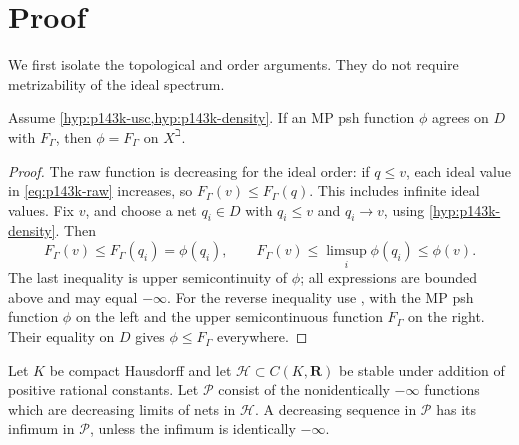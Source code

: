 \section{Proof}

We first isolate the topological and order arguments. They do not require
metrizability of the ideal spectrum.

\begin{lemma}\label{lem:p143k-comparison}
Assume \cref{hyp:p143k-usc,hyp:p143k-density}. If an MP psh function
\(\phi\) agrees on \(D\) with \(F_\Gamma\), then
\(\phi=F_\Gamma\) on \(X^\beth\).
\end{lemma}

\begin{proof}
The raw function is decreasing for the ideal order: if \(q\leq v\),
each ideal value in \eqref{eq:p143k-raw} increases, so
\(F_\Gamma(v)\leq F_\Gamma(q)\). This includes infinite ideal values.
Fix \(v\), and choose a net \(q_i\in D\) with \(q_i\leq v\) and
\(q_i\to v\), using \cref{hyp:p143k-density}. Then
\[
 F_\Gamma(v)\leq F_\Gamma(q_i)=\phi(q_i),
 \qquad
 F_\Gamma(v)\leq\limsup_i\phi(q_i)\leq\phi(v).
\]
The last inequality is upper semicontinuity of \(\phi\); all expressions
are bounded above and may equal \(-\infty\).
For the reverse inequality use
\cite[Theorem~4.3.8]{MP24}, with the MP psh function \(\phi\) on the
left and the upper semicontinuous function \(F_\Gamma\) on the right.
Their equality on \(D\) gives \(\phi\leq F_\Gamma\) everywhere.
\end{proof}

\begin{lemma}\label{lem:p143k-decreasing-completion}
Let \(K\) be compact Hausdorff and let \(\mathcal H\subset C(K,\mathbf R)\)
be stable under addition of positive rational constants. Let
\(\mathcal P\) consist of the nonidentically \(-\infty\) functions which
are decreasing limits of nets in \(\mathcal H\). A decreasing sequence
in \(\mathcal P\) has its infimum in \(\mathcal P\), unless the infimum
is identically \(-\infty\).
\end{lemma}

